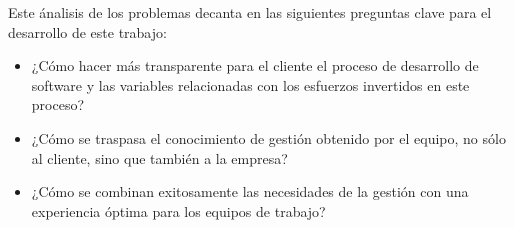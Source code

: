 Este ánalisis de los problemas decanta en las siguientes preguntas clave para el
desarrollo de este trabajo:

\begin{itemize}
  \item ¿Cómo hacer más transparente para el cliente el proceso de desarrollo de
  software y las variables relacionadas con los esfuerzos invertidos en este proceso?
  \item ¿Cómo se traspasa el conocimiento de gestión obtenido por el equipo,
  no sólo al cliente, sino que también a la empresa?
  \item ¿Cómo se combinan exitosamente las necesidades de la gestión con una
  experiencia óptima para los equipos de trabajo?
\end{itemize}
  
